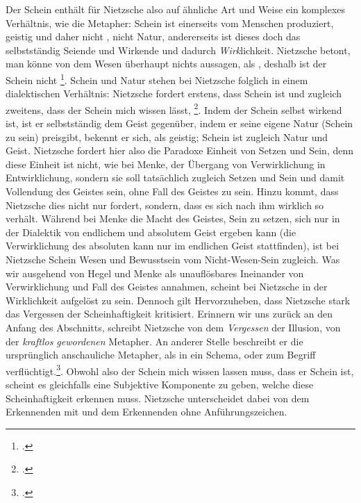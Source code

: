 \documentclass[12pt, a4paper, openany]{report}
\begin{document}
Der Schein enthält für Nietzsche also auf ähnliche Art und Weise ein komplexes Verhältnis, wie die Metapher: 
Schein ist einerseits vom Menschen produziert, geistig und daher nicht , nicht Natur, andererseits ist dieses doch das selbstständig Seiende und Wirkende und dadurch \emph{Wirk}lichkeit.
Nietzsche betont, man könne von dem Wesen überhaupt nichts aussagen, als , deshalb ist der Schein nicht \footcite[][417]{nietzsche_geburt_1999}.
Schein und Natur stehen bei Nietzsche folglich in einem dialektischen Verhältnis:
Nietzsche fordert erstens, dass Schein  ist und zugleich zweitens, dass der Schein mich wissen lässt, \footcite[][417]{nietzsche_morgenrote_1999}.
Indem der Schein selbst wirkend ist, ist er selbstständig dem Geist gegenüber, indem er seine eigene Natur (Schein zu sein) preisgibt, bekennt er sich, als geistig;
Schein ist zugleich Natur und Geist.
Nietzsche fordert hier also die Paradoxe Einheit von Setzen und Sein, denn diese Einheit ist nicht, wie bei Menke, der Übergang von Verwirklichung in Entwirklichung, sondern sie soll tatsächlich zugleich Setzen und Sein und damit Vollendung des Geistes sein, ohne Fall des Geistes zu sein.
Hinzu kommt, dass Nietzsche dies nicht nur fordert, sondern, dass es sich nach ihm wirklich so verhält.
Während bei Menke die Macht des Geistes, Sein zu setzen, sich nur in der Dialektik von endlichem und absolutem Geist ergeben kann (die Verwirklichung des absoluten kann nur im endlichen Geist stattfinden), ist bei Nietzsche Schein Wesen und Bewusstsein vom Nicht-Wesen-Sein zugleich.
Was wir ausgehend von Hegel und Menke als unauflösbares Ineinander von Verwirklichung und Fall des Geistes annahmen, scheint bei Nietzsche in der Wirklichkeit aufgelöst zu sein. 
Dennoch gilt Hervorzuheben, dass Nietzsche stark das Vergessen der Scheinhaftigkeit kritisiert. 
Erinnern wir uns zurück an den Anfang des Abschnitts, schreibt Nietzsche von dem \emph{Vergessen} der Illusion, von der \emph{kraftlos gewordenen} Metapher. 
An anderer Stelle beschreibt er die ursprünglich anschauliche Metapher, als in ein Schema, oder zum Begriff verflüchtigt.\footcite[Vgl.][881]{nietzsche_geburt_1999}.
Obwohl also der Schein mich wissen lassen muss, dass er Schein ist, scheint es gleichfalls eine Subjektive Komponente zu geben, welche diese Scheinhaftigkeit erkennen muss.
Nietzsche unterscheidet dabei von dem Erkennenden mit und dem Erkennenden ohne Anführungszeichen. 
\end{document}
